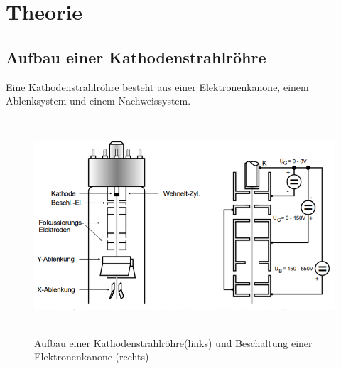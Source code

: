 \section{Theorie}
\label{sec:Theorie}

\cite{sample}

\subsection{Aufbau einer Kathodenstrahlröhre}

Eine Kathodenstrahlröhre besteht aus einer Elektronenkanone, einem Ablenksystem und einem Nachweissystem.

\begin{figure}[H]
  \centering
  \includegraphics[height=8cm]{kathodenstrahlroehre.PNG}
  \caption{Aufbau einer Kathodenstrahlröhre(links) und Beschaltung einer Elektronenkanone (rechts)}
  \label{fig:kathode}
\end{figure}
